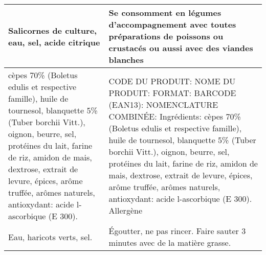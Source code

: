 \begin{longtable}{p{7cm}p{7cm}}
                                                                                                                                                                                                                                                        Salicornes de culture, eau, sel, acide citrique &                                                                                                                                                                                                                                                                                                                                          Se consomment en légumes d'accompagnement avec toutes préparations de poissons ou crustacés ou aussi avec des viandes blanches \\ \hline
        cèpes 70\% (Boletus edulis et respective famille), huile de tournesol, blanquette 5\% (Tuber borchii Vitt.), oignon, beurre, sel, protéines du lait, farine de riz, amidon de mais, dextrose, extrait de levure, épices, arôme truffée, arômes naturels, antioxydant: acide l-ascorbique (E 300). &  CODE DU PRODUIT:  \newline NOME DU PRODUIT:  \newline FORMAT:  \newline BARCODE (EAN13):  \newline NOMENCLATURE COMBINÉE:  \newline   \newline   \newline Ingrédients:  cèpes  70\%  (Boletus  edulis  et  respective  famille),  huile  de  tournesol,    blanquette  5\%  (Tuber  borchii  Vitt.),  \newline oignon,  beurre,  sel,  protéines  du  lait,  farine  de  riz,  amidon  de  mais,  dextrose,  extrait  de  levure,  épices,  arôme  truffée,  \newline arômes naturels, antioxydant: acide l-ascorbique (E 300).  \newline   \newline Allergène   \\ \hline
                                                                                                                                                                                                                                                                              Eau, haricots verts, sel. &                                                                                                                                                                                                                                                                                                                                                                                           Égoutter, ne pas \newline rincer. Faire sauter 3 \newline minutes avec de la \newline matière grasse. \\ \hline
\end{longtable}
